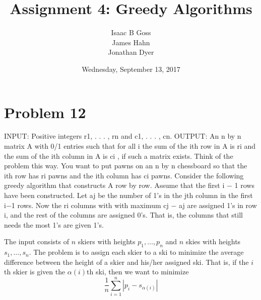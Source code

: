 \documentclass{article}
\author{Isaac B Goss\\ James Hahn\\ Jonathan Dyer}
\title{Assignment 4: Greedy Algorithms}
\date{Wednesday, September 13, 2017}
\providecommand{\prob}[1]{\section*{Problem #1}}
\begin{document}
\maketitle

    \prob{12}
	INPUT: Positive integers r1, . . . , rn and c1, . . . , cn.
	OUTPUT: An n by n matrix A with 0/1 entries such that for all i the sum of the ith row in A is ri
	and the sum of the ith column in A is ci
	, if such a matrix exists.
	Think of the problem this way. You want to put pawns on an n by n chessboard so that the ith row
	has ri pawns and the ith column has ci pawns.
	Consider the following greedy algorithm that constructs A row by row. Assume that the first i − 1
	rows have been constructed. Let aj be the number of 1’s in the jth column in the first i−1 rows. Now
	the ri columns with with maximum cj − aj are assigned 1’s in row i, and the rest of the columns are
	assigned 0’s. That is, the columns that still needs the most 1’s are given 1’s.

	The input consists of $n$ skiers with heights $p_1,\dots,p_n$ and $n$ skies with heights $s_1,\dots,s_n$.
    The problem is to assign each skier to a ski to minimize the average difference between the height of a skier and his/her assigned ski.
    That is, if the $i$th skier is given the $\alpha(i)$th ski, then we want to minimize
    $$ \frac{1}{n} \sum_{i=1}^n |p_i - s_{\alpha(i)} | $$
\end{document}
